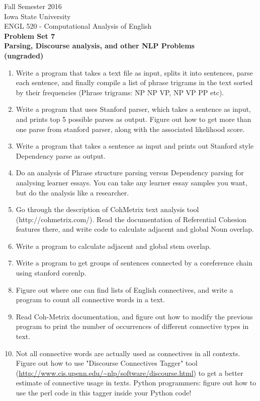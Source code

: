 \documentclass[11pt,a4paper]{article}
\begin{document}
\begin{center}
  Fall Semester 2016 \\ Iowa State University\\[3ex]
  {\large ENGL 520 - Computational Analysis of English}\\[3ex]
  \textbf{Problem Set 7} \\ \textbf{Parsing, Discourse analysis, and other NLP Problems\\ (ungraded)}
\end{center}

\begin{enumerate}
\item Write a program that takes a text file as input, splits it into sentences, parse each sentence, and finally compile a list of phrase trigrams in the text sorted by their frequencies (Phrase trigrams: NP NP VP, NP VP PP etc). 
\item Write a program that uses Stanford parser, which takes a sentence as input, and prints top 5 possible parses as output. Figure out how to get more than one parse from stanford parser, along with the associated likelihood score.
\item Write a program that takes a sentence as input and prints out Stanford style Dependency parse as output. 
\item Do an analysis of Phrase structure parsing versus Dependency parsing for analysing learner essays. You can take any learner essay samples you want, but do the analysis like a researcher.
\item Go through the description of CohMetrix text analysis tool (http://cohmetrix.com/). Read the documentation of Referential Cohesion features there, and write code to calculate adjacent and global Noun overlap.
\item Write a program to calculate adjacent and global stem overlap.
\item Write a program to get groups of sentences connected by a coreference chain using stanford corenlp.
\item Figure out where one can find lists of English connectives, and write a program to count all connective words in a text.
\item Read Coh-Metrix documentation, and figure out how to modify the previous program to print the number of occurrences of different connective types in text.
\item Not all connective words are actually used as connectives in all contexts. Figure out how to use "Discourse Connectives Tagger" tool (\url{http://www.cis.upenn.edu/~nlp/software/discourse.html}) to get a better estimate of connective usage in texts. Python programmers: figure out how to use the perl code in this tagger inside your Python code!
\end{enumerate}
\end{document}
